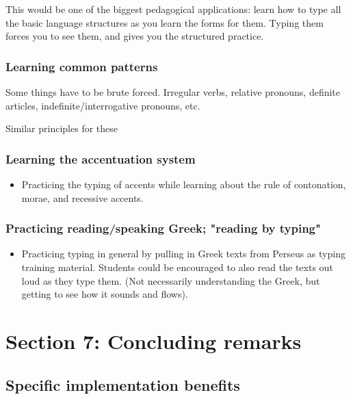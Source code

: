 \documentclass[11pt]{article}
\begin{document}
This would be one of the biggest pedagogical applications: learn how to type all the basic language structures as you learn the forms for them. Typing them forces you to see them, and gives you the structured practice.

\subsubsection{Learning common patterns}
\label{sec:orge5f997e}

Some things have to be brute forced. Irregular verbs, relative pronouns, definite articles, indefinite/interrogative pronouns, etc.

Similar principles for these

\subsubsection{Learning the accentuation system}
\label{sec:orgb7bc76d}

\begin{itemize}
\item Practicing the typing of accents while learning about the rule of contonation, morae, and recessive accents.
\end{itemize}

\subsubsection{Practicing reading/speaking Greek; "reading by typing"}
\label{sec:org91d8db9}

\begin{itemize}
\item Practicing typing in general by pulling in Greek texts from Perseus as typing training material. Students could be encouraged to also read the texts out loud as they type them. (Not necessarily understanding the Greek, but getting to see how it sounds and flows).
\end{itemize}

\section{Section 7: Concluding remarks}
\label{sec:org65e70a2}

\subsection{Specific implementation benefits}
\label{sec:org968a0f7}
\end{document}
